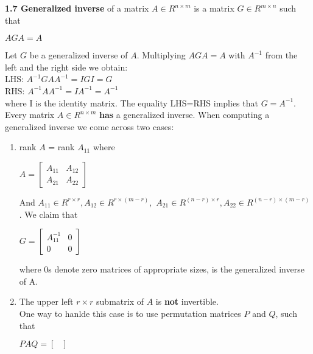 \documentclass{article}
\begin{document}
\begin{multicols}{2}
	\textbf{1.7 Generalized inverse} of a matrix
	$A \in R^{n \times m}$ is a matrix $G \in R^{m \times n}$ such that
	\begin{center}
		$AGA = A$
	\end{center}
	Let $G$ be a generalized inverse of $A$. Multiplying $AGA=A$ with $A^{-1}$ from the
	left and the right side we obtain:\\
	LHS: $A^{-1}GAA^{-1} = IGI = G$\\
	RHS: $A^{-1}AA^{-1} = IA^{-1} = A^{-1}$\\
	where I is the identity matrix. The equality LHS=RHS implies that $G=A^{-1}$.\\
	Every matrix $A \in R^{n \times m}$ \textbf{has} a generalized inverse. When computing
	a generalized inverse we come across two cases:
	\begin{enumerate}
		\item rank $A$ = rank $A_{11}$ where
		      \begin{center}
			      \begin{math}
				      A=
				      \begin{bmatrix}
					      A_{11} & A_{12} \\
					      A_{21} & A_{22}
				      \end{bmatrix}
			      \end{math}
		      \end{center}
		      And $A_{11} \in R^{r \times r}, A_{12} \in R^{r \times (m-r)},$
		      $ A_{21} \in R^{(n-r) \times r}, A_{22} \in R^{(n-r)\times (m-r)}$.
		      We claim that
		      \begin{center}
			      \begin{math}
				      G=
				      \begin{bmatrix}
					      A_{11}^{-1} & 0 \\
					      0           & 0
				      \end{bmatrix}
			      \end{math}
		      \end{center}
		      where 0s denote zero matrices of appropriate sizes, is the generalized inverse of A.
		\item The upper left $r \times r$ submatrix of $A$ is \textbf{not} invertible.\\
		      One way to hanlde this case is to use permutation matrices $P$ and $Q$, such that
		      \begin{center}
			      \begin{math}
				      PAQ =
				      \begin{bmatrix}

\end{bmatrix}
\end{math}
\end{center}
\end{enumerate}
\end{multicols}
\end{document}
